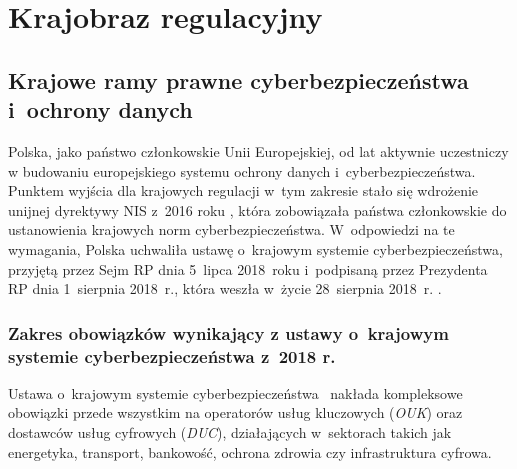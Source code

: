 \chapter{Krajobraz regulacyjny}

\section{Krajowe ramy prawne cyberbezpieczeństwa i~ochrony danych}

Polska, jako państwo członkowskie Unii Europejskiej, od lat aktywnie uczestniczy w budowaniu europejskiego systemu ochrony danych i~cyberbezpieczeństwa. Punktem wyjścia dla krajowych regulacji w~tym zakresie stało się wdrożenie unijnej dyrektywy NIS z~2016 roku \autocite{dyrektywa_nis}, która zobowiązała państwa członkowskie do ustanowienia krajowych norm cyberbezpieczeństwa. W~odpowiedzi na te wymagania, Polska uchwaliła ustawę o~krajowym systemie cyberbezpieczeństwa, przyjętą przez Sejm RP dnia 5~lipca 2018~roku i~podpisaną przez Prezydenta RP dnia 1~sierpnia 2018~r., która weszła w~życie 28~sierpnia 2018~r.
\autocite{uksc2018}.

\subsection{Zakres obowiązków wynikający z ustawy o~krajowym systemie cyberbezpieczeństwa z~2018 r.}

Ustawa o~krajowym systemie cyberbezpieczeństwa~\autocite{uksc2018} nakłada kompleksowe obowiązki przede wszystkim na operatorów usług kluczowych (\textit{OUK}) oraz dostawców usług cyfrowych (\textit{DUC}), działających w~sektorach takich jak energetyka, transport, bankowość, ochrona zdrowia czy infrastruktura cyfrowa.

